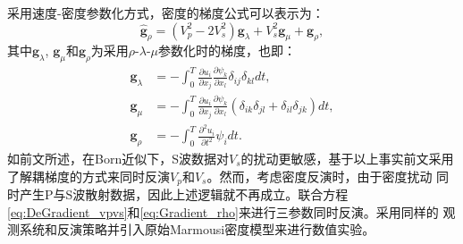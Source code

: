 采用速度-密度参数化方式，密度的梯度公式可以表示为\cite[]{mora:1987,kohn:2012}：
\begin{equation} 
    \hat{\mathbf{g}}_{\rho}=(V^2_p-2V^2_s)\mathbf{g}_{\lambda}+V^2_s\mathbf{g}_{\mu}+\mathbf{g}_{\rho},
    \label{eq:Gradient_rho} 
\end{equation}
其中$\mathbf{g}_{\lambda}$, $\mathbf{g}_{\mu}$和$\mathbf{g}_{\rho}$为采用$\rho$-$\lambda$-$\mu$参数化时的梯度，也即：
    \begin{equation} 
        \begin{split}
                \mathbf{g}_{\lambda}&=-\int_{0}^{T}\frac{\partial u_i}{\partial
        x_j}\frac{\partial \psi_k}{\partial x_l}
        \delta_{ij}\delta_{kl}dt,\\
                \mathbf{g}_{\mu}&=-\int_{0}^{T}\frac{\partial u_i}{\partial
        x_j}\frac{\partial \psi_k}{\partial x_l} 
        (\delta_{ik}\delta_{jl}+\delta_{il}\delta_{jk})dt,\\
                \mathbf{g}_{\rho}&=-\int_{0}^{T}\frac{\partial^2 u_i}{\partial
        t^2}\psi_idt.
        \end{split}
        \label{eq:DeGradient_vpvsrho}
    \end{equation}
如前文所述，在Born近似下，S波数据对$V_s$的扰动更敏感，基于以上事实前文采用了解耦梯度的方式来同时反演$V_p$和$V_s$。然而，考虑密度反演时，由于密度扰动
同时产生P与S波散射数据，因此上述逻辑就不再成立。联合方程\eqref{eq:DeGradient_vpvs}和\eqref{eq:Gradient_rho}来进行三参数同时反演。采用同样的
观测系统和反演策略并引入原始Marmousi密度模型来进行数值实验。

